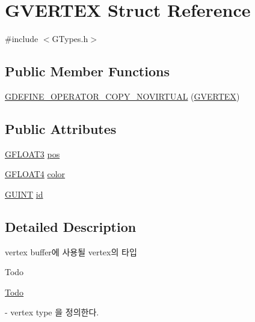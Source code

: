 \hypertarget{struct_g_v_e_r_t_e_x}{}\section{G\+V\+E\+R\+T\+E\+X Struct Reference}
\label{struct_g_v_e_r_t_e_x}


{\ttfamily \#include $<$G\+Types.\+h$>$}

\subsection*{Public Member Functions}
\begin{DoxyCompactItemize}
\item 
\hyperlink{struct_g_v_e_r_t_e_x_ae761dd21315d6cf082379c2dddc41a7b}{G\+D\+E\+F\+I\+N\+E\+\_\+\+O\+P\+E\+R\+A\+T\+O\+R\+\_\+\+C\+O\+P\+Y\+\_\+\+N\+O\+V\+I\+R\+T\+U\+A\+L} (\hyperlink{struct_g_v_e_r_t_e_x}{G\+V\+E\+R\+T\+E\+X})
\end{DoxyCompactItemize}
\subsection*{Public Attributes}
\begin{DoxyCompactItemize}
\item 
\hyperlink{_g_types_8h_a7f35886af6bc3271b59984611c1028fb}{G\+F\+L\+O\+A\+T3} \hyperlink{struct_g_v_e_r_t_e_x_adb54d5a107adc1d3d4ac6012b4694d21}{pos}
\item 
\hyperlink{_g_types_8h_a647c8d47efa6fd6ce1f3aff7f33baa87}{G\+F\+L\+O\+A\+T4} \hyperlink{struct_g_v_e_r_t_e_x_a1831ef4dfeb95944d5b29ea0c2c2d6a8}{color}
\item 
\hyperlink{_g_types_8h_a415305cdf38fc38f67c037973e9a748c}{G\+U\+I\+N\+T} \hyperlink{struct_g_v_e_r_t_e_x_a165c7204c97ce38a8447d52f9c161722}{id}
\end{DoxyCompactItemize}


\subsection{Detailed Description}

\begin{DoxyItemize}
\item vertex buffer에 사용될 vertex의 타입 \begin{DoxyRefDesc}{Todo}
\item[\hyperlink{todo__todo000010}{Todo}]\end{DoxyRefDesc}
-\/ vertex type 을 정의한다. 
\end{DoxyItemize}


